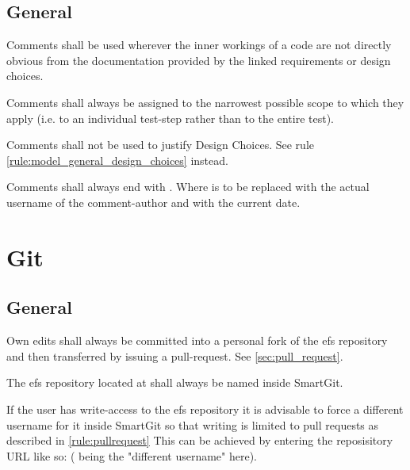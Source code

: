 \documentclass[draft]{efsguide}
\begin{document}
\section{General}
\begin{rules}
\item Comments shall be used wherever the inner workings of a code are not directly obvious from the documentation provided by the linked requirements or design choices. 
\item Comments shall always be assigned to the narrowest possible scope to which they apply (i.e. to an individual test-step rather than to the entire test). 
\item Comments shall not be used to justify Design Choices. See rule \ref{rule:model_general_design_choices} instead. 
\item {} Comments shall always end with . Where  is to be replaced with the actual username of the comment-author and  with the current date. 
\end{rules}


\chapter{Git}
\section{General}
\begin{rules}
\item \label{rule:pullrequest} Own edits shall always be committed into a personal fork of the \gls{efs} repository and then transferred by issuing a pull-request. See \ref{sec:pull_request}. 
\item The \gls{efs} repository located at  shall always be named  inside SmartGit. 
\item If the user has write-access to the \gls{efs} repository it is advisable to force a different username for it inside SmartGit so that writing is limited to pull requests as described in \ref{rule:pullrequest} This can be achieved by entering the reposisitory URL like so:  ( being the "different username" here). 

\end{rules}
\end{document}
